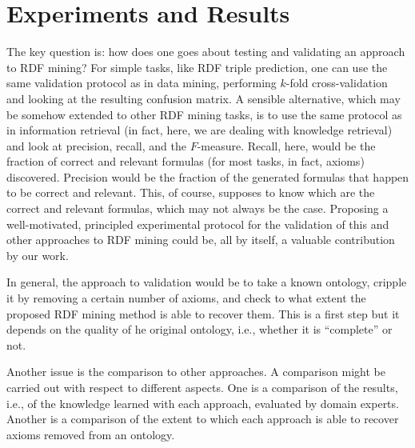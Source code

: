 \documentclass[a4paper]{article}
\newcounter{ex}
\begin{document}
\section{Experiments and Results}

The key question is: how does one goes about testing and validating an approach
to RDF mining? For simple tasks, like RDF triple prediction, one can use the same
validation protocol as in data mining, performing $k$-fold cross-validation and
looking at the resulting confusion matrix. A sensible alternative, which may be
somehow extended to other RDF mining tasks, is to use the same protocol as in
information retrieval (in fact, here, we are dealing with knowledge retrieval)
and look at precision, recall, and the $F$-measure.
Recall, here, would be the fraction of correct and relevant formulas
(for most tasks, in fact, axioms) discovered.
Precision would be the fraction of the generated formulas that happen to be correct and relevant.
This, of course, supposes to know which are the correct and relevant formulas, which
may not always be the case.
Proposing a well-motivated, principled experimental protocol for the validation
of this and other approaches to RDF mining could be, all by itself, a valuable
contribution by our work.

In general, the approach to validation would be to take a known ontology,
cripple it by removing a certain number of axioms, and check
to what extent the proposed RDF mining method is able to recover them.
This is a first step but it depends on the quality of he original ontology,
i.e., whether it is ``complete'' or not.

Another issue is the comparison to other approaches. A comparison might be carried out
with respect to different aspects.
One is a comparison of the results, i.e., of the knowledge learned with each approach,
evaluated by domain experts.
Another is a comparison of the extent to which each approach is able to recover axioms
removed from an ontology.



\end{document}
